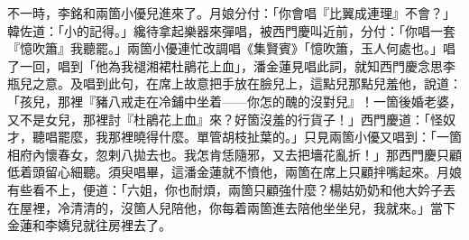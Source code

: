 不一時，李銘和兩箇小優兒進來了。月娘分付：「你會唱『比翼成連理』不會？」韓佐道：「小的記得。」纔待拿起樂器來彈唱，被西門慶叫近前，分付：「你唱一套『憶吹簫』我聽罷。」兩箇小優連忙改調唱《集賢賓》「憶吹簫，玉人何處也。」唱了一回，唱到「他為我褪湘裙杜鵑花上血」，潘金蓮見唱此詞，就知西門慶念思李瓶兒之意。{}及唱到此句，在席上故意把手放在臉兒上，這點兒那點兒羞他，{}說道：「孩兒，那裡『豬八戒走在冷鋪中坐着——你怎的醜的沒對兒』！一箇後婚老婆，又不是女兒，那裡討『杜鵑花上血』來？好箇沒羞的行貨子！」西門慶道：「怪奴才，聽唱罷麼，我那裡曉得什麼。單管胡枝扯葉的。」只見兩箇小優又唱到：「一箇相府內懷春女，忽剌八拋去也。我怎肯恁隨邪，又去把墻花亂折！」那西門慶只顧低着頭留心細聽。{}須臾唱畢，這潘金蓮就不憤他，兩箇在席上只顧拌嘴起來。月娘有些看不上，便道：「六姐，你也耐煩，兩箇只顧強什麼？楊姑奶奶和他大妗子丟在屋裡，冷清清的，沒箇人兒陪他，你每着兩箇進去陪他坐坐兒，我就來。」當下金蓮和李嬌兒就往房裡去了。

